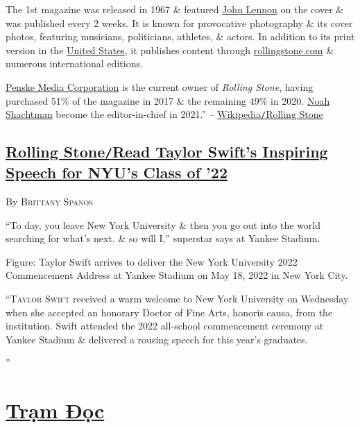 \documentclass[oneside]{book}
\numberwithin{equation}{section}
\begin{document}
The 1st magazine was released in 1967 \& featured \href{https://en.wikipedia.org/wiki/John_Lennon}{John Lennon} on the cover \& was published every 2 weeks. It is known for provocative photography \& its cover photos, featuring musicians, politicians, athletes, \& actors. In addition to its print version in the \href{https://en.wikipedia.org/wiki/United_States}{United States}, it publishes content through \url{rollingstone.com} \& numerous international editions.

\href{https://en.wikipedia.org/wiki/Penske_Media_Corporation}{Penske Media Corporation} is the current owner of \textit{Rolling Stone}, having purchased 51\% of the magazine in 2017 \& the remaining 49\% in 2020. \href{https://en.wikipedia.org/wiki/Noah_Shachtman}{Noah Shachtman} become the editor-in-chief in 2021.'' -- \href{https://en.wikipedia.org/wiki/Rolling_Stone}{Wikipedia\texttt{/}Rolling Stone}

\section{\href{https://www.rollingstone.com/music/music-news/taylor-swift-nyu-speech-1355121/}{Rolling Stone\texttt{/}Read Taylor Swift's Inspiring Speech for NYU's Class of '22}}
\begin{flushright}
	By \textsc{Brittany Spanos}
\end{flushright}
``To day, you leave New York University \& then you go out into the world searching for what's next. \& so will I,'' superstar says at Yankee Stadium.

\textsf{Figure: Taylor Swift arrives to deliver the New York University 2022 Commencement Address at Yankee Stadium on May 18, 2022 in New York City.}

``\textsc{Taylor Swift} received a warm welcome to New York University on Wednesday when she accepted an honorary Doctor of Fine Arts, honoris causa, from the institution. Swift attended the 2022 all-school commencement ceremony at Yankee Stadium \& delivered a rousing speech for this year's graduates.



''



\chapter{\href{http://www.tramdoc.vn/}{Trạm Đọc}}
\end{document}
